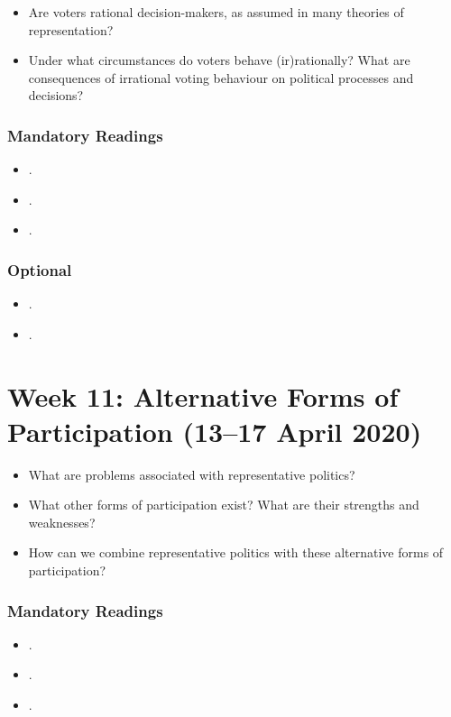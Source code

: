 \documentclass[abstract=on,parskip=full,headings=standardclasses,fontsize=11pt,paper=a4]{scrartcl}
\begin{document}
\begin{itemize}
\renewcommand\labelitemi{--}
\item Are voters rational decision-makers, as assumed in many theories of representation? 
\item Under what circumstances do voters behave (ir)rationally? What are consequences of irrational voting behaviour on political processes and decisions?
\end{itemize}


\subsubsection*{Mandatory Readings}


 \begin{itemize}
\item {}.
\item {}.
\item {}.
\end{itemize}

\subsubsection*{Optional}
\begin{itemize}
\item {}.
\item {}.
\end{itemize}



\section{Week 11: Alternative Forms of Participation (13--17 April 2020)}

\begin{itemize}
\renewcommand\labelitemi{--}
\item What are problems associated with representative politics?
\item What other forms of participation exist? What are their strengths and weaknesses?
\item How can we combine representative politics with these alternative forms of participation?
\end{itemize}

\subsubsection*{Mandatory Readings}
\begin{itemize}
\item {}.
\item {}.
\item {}.
\end{itemize}
\end{document}
